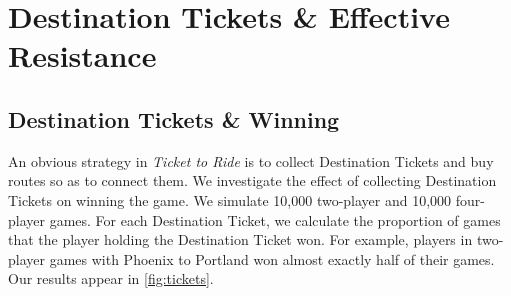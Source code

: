 \newpage
\section{Destination Tickets \& Effective Resistance}

\subsection{Destination Tickets \& Winning}
An obvious strategy in \textit{Ticket to Ride} is to collect
Destination Tickets and buy routes so as to connect them.
We investigate the effect of collecting Destination Tickets
on winning the game.
We simulate 10,000 two-player and 10,000 four-player games.
For each Destination Ticket, we calculate the proportion of 
games that the player holding the Destination Ticket won.
For example, players in two-player games with Phoenix to Portland
won almost exactly half of their games.
Our results appear in \cref{fig:tickets}.

